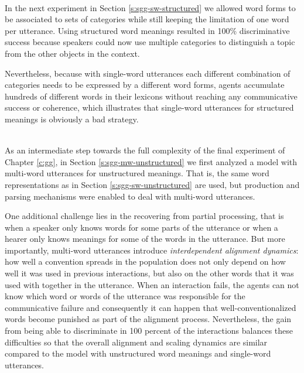 ~\\

In the next experiment in Section \ref{s:sgg-sw-structured} we allowed
word forms to be associated to sets of categories while still keeping
the limitation of one word per utterance. Using structured word
meanings resulted in 100\% discriminative success because speakers
could now use multiple categories to distinguish a topic from the
other objects in the context.

Nevertheless, because with single-word utterances each different
combination of categories needs to be expressed by a different word
forms, agents accumulate hundreds of different words in their lexicons
without reaching any communicative success or coherence, which
illustrates that single-word utterances for structured meanings is
obviously a bad strategy.

~\\


As an intermediate step towards the full complexity of the final
experiment of Chapter \ref{c:gg}, in Section
\ref{s:sgg-mw-unstructured} we first analyzed a model with multi-word
utterances for unstructured meanings. That is, the same word
representations as in Section \ref{s:sgg-sw-unstructured} are used,
but production and parsing mechanisms were enabled to deal with
multi-word utterances.

One additional challenge lies in the recovering from partial
processing, that is when a speaker only knows words for some parts of
the utterance or when a hearer only knows meanings for some of the
words in the utterance. But more importantly, multi-word utterances
introduce \emph{interdependent alignment dynamics}: how well a
convention spreads in the population does not only depend on how well
it was used in previous interactions, but also on the other words that
it was used with together in the utterance. When an interaction fails,
the agents can not know which word or words of the utterance was
responsible for the communicative failure and consequently it can
happen that well-conventionalized words become punished as part of the
alignment process. Nevertheless, the gain from being able to
discriminate in 100 percent of the interactions balances these
difficulties so that the overall alignment and scaling dynamics are
similar compared to the model with unstructured word meanings and
single-word utterances.


